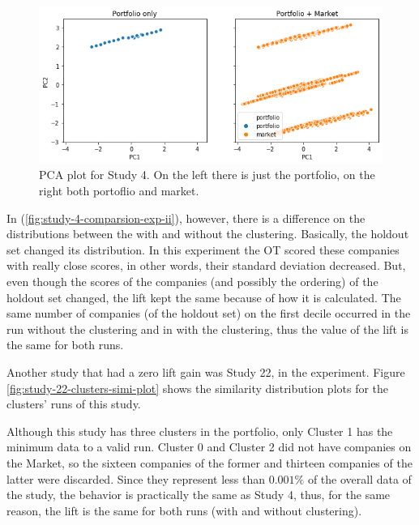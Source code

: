 \begin{figure}[!ht]
   \centering
   \includegraphics[width=\linewidth]{fig/ch4-study-4-pca-plot.png}
   \caption{PCA plot for Study 4. On the left there is just the portfolio, on the right both portoflio and market.}
   \label{fig:study-4-pca-plot}
\end{figure}

In \nameExperimentII{} (\ref{fig:study-4-comparsion-exp-ii}), however, there is a difference on the distributions between the with and without the clustering. Basically, the holdout set changed its distribution. In this experiment the OT scored these companies with really close scores, in other words, their standard deviation decreased. But, even though the scores of the companies (and possibly the ordering) of the holdout set changed, the lift kept the same because of how it is calculated. The same number of companies (of the holdout set) on the first decile occurred in the run without the clustering and in with the clustering, thus the value of the lift is the same for both runs.

Another study that had a zero lift gain was Study 22, in the \nameExperimentI{} experiment. Figure \ref{fig:study-22-clusters-simi-plot} shows the similarity distribution plots for the clusters' runs of this study.

Although this study has three clusters in the portfolio, only Cluster 1 has the minimum data to a valid run. Cluster 0 and Cluster 2 did not have companies on the Market, so the sixteen companies of the former and thirteen companies of the latter were discarded. Since they represent less than $0.001\%$ of the overall data of the study, the behavior is practically the same as Study 4, thus, for the same reason, the lift is the same for both runs (with and without clustering).


